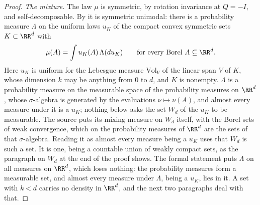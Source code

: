 \begin{proof}
\emph{The mixture.} The law $\mu$ is symmetric, by rotation invariance at $Q = -I$, and
self-decomposable. By  it is symmetric unimodal: there is a probability measure
$\Lambda$ on the uniform laws $u_K$ of the compact convex symmetric sets $K \subset \RR^d$ with
\[
  \mu(A) = \int u_K(A)\,\Lambda(du_K) \qquad \text{for every Borel } A \subseteq \RR^d .
\]
Here $u_K$ is uniform for the Lebesgue measure $\mathrm{Vol}_V$ of the linear span $V$ of $K$, whose
dimension $k$ may be anything from $0$ to $d$, and $K$ is nonempty. $\Lambda$ is a probability
measure on the measurable space of the probability measures on $\RR^d$, whose $\sigma$-algebra is
generated by the evaluations $\nu \mapsto \nu(A)$, and almost every measure under it is a $u_K$;
nothing below asks the set $W_d$ of the $u_K$ to be measurable. The source puts its mixing measure
on $W_d$ itself, with the Borel sets of weak convergence, which on the probability measures of
$\RR^d$ are the sets of that $\sigma$-algebra. Reading it as almost every measure being a $u_K$
uses that $W_d$ is such a set. It is one, being a countable union of weakly compact sets, as the
paragraph on $W_d$ at the end of the proof shows. The formal statement puts
$\Lambda$ on all measures on $\RR^d$, which loses nothing: the probability measures form a
measurable set, and almost every measure under $\Lambda$, being a $u_K$, lies in it. A set with
$k < d$ carries no density in $\RR^d$, and the next two paragraphs deal with that.


\end{proof}
